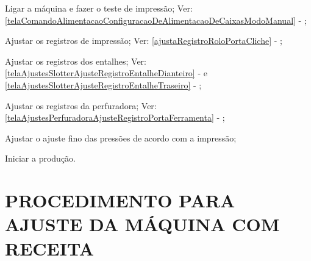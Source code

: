 \begin{procedureAdjustmentNoRecipe}
  \item[\ding{\dingNumber}] Ligar a máquina e fazer o teste de impressão; Ver: \ref{telaComandoAlimentacaoConfiguracaoDeAlimentacaoDeCaixasModoManual} - ;
  \item[\ding{\dingNumber}] Ajustar os registros de impressão; Ver: \ref{ajustaRegistroRoloPortaCliche} - ;
  \item[\ding{\dingNumber}] Ajustar os registros dos entalhes; Ver: \ref{telaAjustesSlotterAjusteRegistroEntalheDianteiro} -  e \ref{telaAjustesSlotterAjusteRegistroEntalheTraseiro} - ;
  \item[\ding{\dingNumber}] Ajustar os registros da perfuradora; Ver: \ref{telaAjustesPerfuradoraAjusteRegistroPortaFerramenta} - ;
  \item[\ding{\dingNumber}] Ajustar o ajuste fino das pressões de acordo com a impressão;
  \item[\ding{\dingNumber}] Iniciar a produção.
  
\end{procedureAdjustmentNoRecipe}

\section{\large{PROCEDIMENTO PARA AJUSTE DA MÁQUINA COM RECEITA}}



